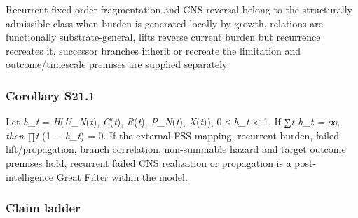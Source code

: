 Recurrent fixed-order fragmentation and CNS reversal belong to the
structurally admissible class when burden is generated locally by
growth, relations are functionally substrate-general, lifts reverse
current burden but recurrence recreates it, successor branches inherit
or recreate the limitation and outcome/timescale premises are supplied
separately.

\hypertarget{corollary-s21.1}{%
\subsubsection{Corollary S21.1}\label{corollary-s21.1}}

Let \emph{h\_t} = \emph{H}(\emph{U\_N}(\emph{t}), \emph{C}(\emph{t}),
\emph{R}(\emph{t}), \emph{P\_N}(\emph{t}), \emph{X}(\emph{t})), 0 ≤
\emph{h\_t} \textless{} 1. If ∑\emph{\emph{t} \emph{h\_t} = ∞, then ∏t}
(1 − \emph{h\_t}) = 0. If the external FSS mapping, recurrent burden,
failed lift/propagation, branch correlation, non-summable hazard and
target outcome premises hold, recurrent failed CNS realization or
propagation is a post-intelligence Great Filter within the model.

\hypertarget{claim-ladder}{%
\subsubsection{Claim ladder}\label{claim-ladder}}

